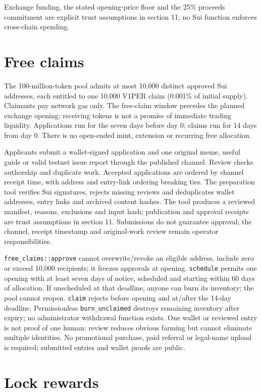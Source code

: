 \documentclass[11pt]{article}
\newcommand{\VOnePER}{\texorpdfstring{V\textcolor{brandone}{1}PER}{V1PER}}
\begin{document}
Exchange funding, the stated opening-price floor and the 25\% proceeds commitment are explicit trust assumptions in section 11; no Sui function enforces cross-chain spending.

\section{Free claims}

The 100-million-token pool admits at most 10,000 distinct approved Sui addresses, each entitled to one 10,000 \VOnePER{} claim (0.001\% of initial supply). Claimants pay network gas only. The free-claim window precedes the planned exchange opening; receiving tokens is not a promise of immediate trading liquidity. Applications run for the seven days before day 0; claims run for 14 days from day 0. There is no open-ended mint, extension or recurring free allocation.

Applicants submit a wallet-signed application and one original meme, useful guide or valid testnet issue report through the published channel. Review checks authorship and duplicate work. Accepted applications are ordered by channel receipt time, with address and entry-link ordering breaking ties. The preparation tool verifies Sui signatures, rejects missing reviews and deduplicates wallet addresses, entry links and archived content hashes. The tool produces a reviewed manifest, reasons, exclusions and input hash; publication and approval receipts are trust assumptions in section 11. Submissions do not guarantee approval; the channel, receipt timestamp and original-work review remain operator responsibilities.

\texttt{free\_claims::approve} cannot overwrite/revoke an eligible address, include zero or exceed 10,000 recipients; it freezes approvals at opening. \texttt{schedule} permits one opening with at least seven days of notice, scheduled and starting within 60 days of allocation. If unscheduled at that deadline, anyone can burn its inventory; the pool cannot reopen. \texttt{claim} rejects before opening and at/after the 14-day deadline. Permissionless \texttt{burn\_unclaimed} destroys remaining inventory after expiry; no administrator withdrawal function exists. One wallet or reviewed entry is not proof of one human: review reduces obvious farming but cannot eliminate multiple identities. No promotional purchase, paid referral or legal-name upload is required; submitted entries and wallet proofs are public.

\section{Lock rewards}
\end{document}
